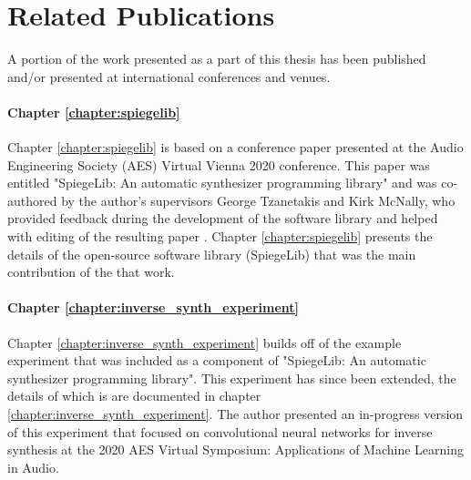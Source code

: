 \newpage
{}

\chapter*{Related Publications}

A portion of the work presented as a part of this thesis has been published and/or presented at international conferences and venues. 

\subsubsection{Chapter \ref{chapter:spiegelib}}
Chapter \ref{chapter:spiegelib} is based on a conference paper presented at the Audio Engineering Society (AES) Virtual Vienna 2020 conference. This paper was entitled "SpiegeLib: An automatic synthesizer programming library" and was co-authored by the author's supervisors George Tzanetakis and Kirk McNally, who provided feedback during the development of the software library and helped with editing of the resulting paper \cite{shier2020spiegelib}. Chapter \ref{chapter:spiegelib} presents the details of the open-source software library (SpiegeLib) that was the main contribution of the that work. 

\subsubsection{Chapter \ref{chapter:inverse_synth_experiment}}
Chapter \ref{chapter:inverse_synth_experiment} builds off of the example experiment that was included as a component of "SpiegeLib: An automatic synthesizer programming library". This experiment has since been extended, the details of which is are documented in chapter \ref{chapter:inverse_synth_experiment}. The author presented an in-progress version of this experiment that focused on convolutional neural networks for inverse synthesis at the 2020 AES Virtual Symposium: Applications of Machine Learning in Audio. 

